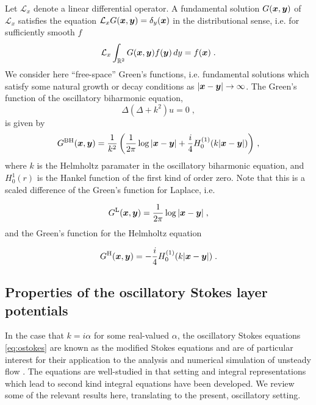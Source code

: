 Let $\mathcal{L}_x$ denote a linear differential operator. A fundamental
solution $G({\boldsymbol x},{\boldsymbol y})$ of $\mathcal{L}_x$ satisfies the equation
$\mathcal{L}_x G({\boldsymbol x},{\boldsymbol y}) = \delta_y({\boldsymbol x})$ in the distributional sense, i.e.
for sufficiently smooth $f$
\begin{equation}
  \mathcal{L}_x \int_{\mathbb{R}^2} G({\boldsymbol x},{\boldsymbol y}) f({\boldsymbol y}) \, dy = f({\boldsymbol x}) \; .
  \nonumber
\end{equation}
We consider here
``free-space'' Green's functions, i.e. fundamental solutions which satisfy
some natural growth or decay conditions as $|{\boldsymbol x}-{\boldsymbol y}| \to \infty$.
The Green's function of the oscillatory biharmonic equation,
\begin{equation}
  \Delta ( \Delta + k^2 ) u = 0 \; , \label{eq:obiharm} \nonumber
\end{equation}
is given by 
\begin{equation}
  G^{\textrm{BH}}({\boldsymbol x},{\boldsymbol y}) = \frac{1}{k^2}
  \left (\frac{1}{2\pi} \log |{\boldsymbol x}-{\boldsymbol y}| +
  \frac{i}{4} H_0^{(1)}(k|{\boldsymbol x}-{\boldsymbol y}|) \right ) \, ,
  \label{eq:Gbh}
\end{equation}
where $k$ is the Helmholtz paramater in the oscillatory biharmonic equation,
and $H_{0}^{1}(r)$ is the Hankel function of the first kind of order zero.
Note that this is a scaled difference of the Green's function for
Laplace, i.e.

\begin{equation}
  G^{\textrm{L}}({\boldsymbol x},{\boldsymbol y}) = \frac{1}{2\pi} \log |{\boldsymbol x}-{\boldsymbol y}| \; , \nonumber
\end{equation}
and the Green's function for the Helmholtz equation

\begin{equation}
  G^{\textrm{H}}({\boldsymbol x},{\boldsymbol y}) = -\frac{i}{4} H_0^{(1)}(k|{\boldsymbol x}-{\boldsymbol y}|) \; . \nonumber
\end{equation}

\subsection{Properties of the oscillatory Stokes layer
  potentials}

In the case that $k=i\alpha$ for some real-valued $\alpha$,
the oscillatory Stokes equations \cref{eq:ostokes}
are known as the modified Stokes equations and are of particular
interest for their application to the analysis and numerical
simulation of unsteady flow
\cite{Pozrikidis1992,biros2002embedded,
  jiang2013second,ladyzhenskaya1969mathematical}.
The equations are well-studied in that setting and
integral representations which lead to second kind
integral equations have been developed. We review
some of the relevant results here, translating to
the present, oscillatory setting.


